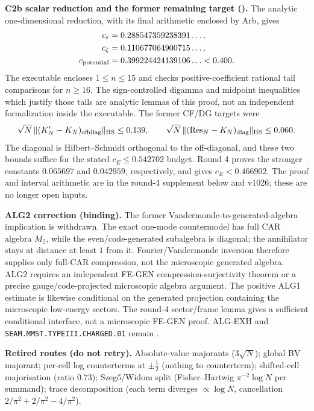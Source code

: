 \par\smallskip\noindent\textbf{C2b scalar reduction and the former remaining target
().}
The analytic one-dimensional reduction, with its final arithmetic enclosed by Arb,
gives
\[
 \begin{aligned}
 c_\varepsilon&=0.288547359238391\ldots,\\
 c_\zeta&=0.110677064900715\ldots,\\
 c_{\rm potential}&=0.399224424139106\ldots<0.400.
 \end{aligned}
\]
The executable encloses $1\le n\le15$ and checks positive-coefficient rational
tail comparisons for $n\ge16$.  The sign-controlled digamma and midpoint
inequalities which justify those tails are analytic lemmas of this proof, not an
independent formalization inside the executable. The former CF/DG targets were
\[
 \sqrt N\,\lVert(K'_N-K_N)_{\rm offdiag}\rVert_{\mathrm{HS}}\le0.139,
 \qquad
 \sqrt N\,\lVert(\mathrm{Res}_N-K_N)_{\rm diag}\rVert_{\mathrm{HS}}\le0.060.
\]
The diagonal is Hilbert--Schmidt orthogonal to the off-diagonal, and these two
bounds suffice for the stated $c_E\le0.542702$ budget. Round 4 proves the
stronger constants $0.065697$ and $0.042959$, respectively, and gives
$c_E<0.466902$. The proof and interval arithmetic are in the round-4
supplement below and v1026; these are no longer open inputs.

\par\smallskip\noindent\textbf{ALG2 correction (binding).}
The former Vandermonde-to-generated-algebra implication is withdrawn.  The exact
one-mode countermodel has full CAR algebra $M_2$, while the even/code-generated
subalgebra is diagonal; the annihilator stays at distance at least $1$ from it.
Fourier/Vandermonde inversion therefore supplies only full-CAR compression, not the
microscopic generated algebra.  ALG2 requires an independent FE-GEN
compression-surjectivity theorem or a precise gauge/code-projected microscopic
algebra argument.  The positive ALG1 estimate is likewise conditional on the
generated projection containing the microscopic low-energy sectors.
The round-4 sector/frame lemma gives a sufficient conditional interface, not
a microscopic FE-GEN proof. ALG-EXH and
\texttt{SEAM.MMST.TYPEIII.CHARGED.01} remain \mO.

\par\smallskip\noindent\textbf{Retired routes (do not retry).}
Absolute-value majorants ($3\sqrt N$); global BV
majorant; per-cell log counterterms at $\pm\tfrac12$ (nothing to counterterm);
shifted-cell majorisation (ratio $0.73$); Szeg\H{o}/Widom split
(Fisher--Hartwig $\pi^{-2}\log N$ per summand); trace decomposition (each term
diverges $\propto\log N$, cancellation $2/\pi^2+2/\pi^2-4/\pi^2$).

